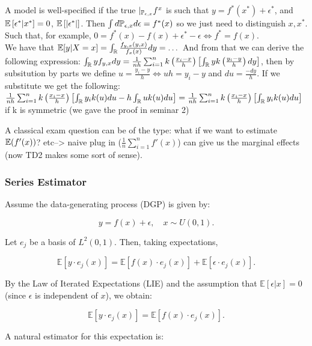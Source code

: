 \documentclass{article}
\begin{document}
A model is well-specified if the true \(|_{\mathbb{P}_{\epsilon, x}}f^{x}\) is such that \(y= f^{*}(x^{*})+ \epsilon^{*}\), and \(\mathbb{E}\left[\epsilon^{*}|x^{*}\right]=0\), \(\mathbb{E}\left[|\epsilon^{*}|\right]\). Then \(\int d\mathbb{P}_{\epsilon, x} d\epsilon= f^{*}(x)\) so we just need to distinguish \(x, x^{*}\). Such that, for example, \(0=f^{*}(x)-f(x)+\epsilon^{*}-\epsilon \iff f^{*}=f(x)\). \\

We have that  \(\mathbb{E}[y|X=x]=\int_{\mathbb{R}}\frac{f_{y,x}(y,x)}{f_{x}(x)}dy=\dots\)
And from that we can derive the following expression: \(\int_{\mathbb{R}}y f_{y,x}dy=\frac{1}{nh}\sum_{i=1}^{n}k\left(\frac{x_i-x}{h}\right)\left[\int_{\mathbb{R}}y k\left(\frac{y_i-y}{h}\right) dy\right]\), then by subsitution by parts we define \(u=\frac{y_i-y}{h}\iff uh=y_i-y\) and \(du=\frac{-dy}{h}\). If we substitute we get the following: \(\frac{1}{nh}\sum_{i=1}^{n}k\left(\frac{x_i-x}{h}\right)\left[\int_{\mathbb{R}}y_i k(u) du- h\int_{\mathbb{R}}u k(u) du\right]=\frac{1}{nh}\sum_{i=1}^{n}k\left(\frac{x_i-x}{h}\right)\left[\int_{\mathbb{R}}y_i k(u) du \right]\)
 if k is symmetric (we gave the proof in seminar 2)

 \begin{remark}
    A classical exam question can be of the type: what if we want to estimate \(\mathbb{E}(f'(x))\)? etc--> naive plug in (\( \frac{1}{n}\sum_{i=1}^{n}f'(x)\)) can give us the marginal effects (now TD2 makes some sort of sense). 
 \end{remark}


 \subsubsection{Series Estimator}

 Assume the data-generating process (DGP) is given by:
 
 $$
 y = f(x) + \epsilon, \quad x \sim U(0,1).
 $$
 
 Let \(e_j\) be a basis of \(L^2(0,1)\). Then, taking expectations,
 
 $$
 \mathbb{E}[y \cdot e_j(x)] = \mathbb{E}[f(x) \cdot e_j(x)] + \mathbb{E}[\epsilon \cdot e_j(x)].
 $$
 
 By the Law of Iterated Expectations (LIE) and the assumption that \(\mathbb{E}[\epsilon | x] = 0\) (since \(\epsilon\) is independent of \(x\)), we obtain:
 
 $$
 \mathbb{E}[y \cdot e_j(x)] = \mathbb{E}[f(x) \cdot e_j(x)].
 $$
 
 A natural estimator for this expectation is:
 
\end{document}
